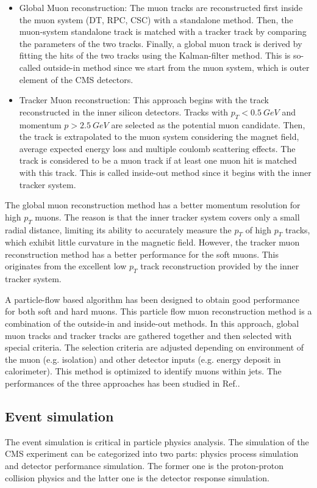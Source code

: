 \begin{itemize}
	\item Global Muon reconstruction: The muon tracks are reconstructed first inside the muon system (DT, RPC, CSC) with a standalone method. Then, the muon-system standalone track is matched with a tracker track by comparing the parameters of the two tracks. Finally, a global muon track is derived by fitting the hits of the two tracks using the Kalman-filter method\cite{Fruhwirth:1987fm}. This is so-called outside-in method since we start from the muon system, which is outer element of the CMS detectors. 
  \item Tracker Muon reconstruction: This approach begins with the track reconstructed in the inner silicon detectors. Tracks with $p_{T}<0.5~GeV$ and momentum $p>2.5~GeV$ are selected as the potential muon candidate. Then, the track is extrapolated to the muon system considering the magnet field, average expected energy loss and multiple coulomb scattering effects. The track is considered to be a muon track if at least one muon hit is matched with this track. This is called inside-out method since it begins with the inner tracker system. 
\end{itemize}

The global muon reconstruction method has a better momentum resolution for high $p_{T}$ muons. The reason is that the inner tracker system covers only a small radial distance, limiting its ability to accurately measure the $p_{T}$ of high $p_{T}$ tracks, which exhibit little curvature in the magnetic field. However, the tracker muon reconstruction method has a better performance for the soft muons. This originates from the excellent low $p_{T}$ track reconstruction provided by the inner tracker system. 

A particle-flow based algorithm has been designed to obtain good performance for both soft and hard muons. This particle flow muon reconstruction method is a combination of the outside-in and inside-out methods. In this approach, global muon tracks and tracker tracks are gathered together and then selected with special criteria. The selection criteria are adjusted depending on environment of the muon (e.g. isolation) and other detector inputs (e.g. energy deposit in calorimeter). This method is optimized to identify muons within jets. The performances of the three approaches has been studied in Ref.\cite{Chatrchyan:2012xi}. 

\clearpage
\subsection{Event simulation}
The event simulation is critical in particle physics analysis. The simulation of the CMS experiment can be categorized into two parts: physics process simulation and detector performance simulation. The former one is the proton-proton collision physics and the latter one is the detector response simulation. 

